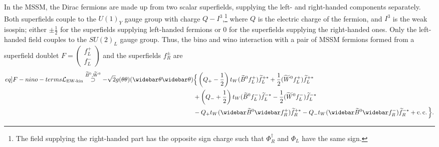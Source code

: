\documentclass[english, notitlepage]{article}
\begin{document}
            In the MSSM, the Dirac fermions are made up from two scalar superfields,
            supplying the left- and right-handed components separately. Both superfields
            couple to the ${U(1)}_Y$ gauge group with charge $Q-I^3$,\footnote{The field
                supplying the right-handed part has the opposite sign charge such that
                $\Phi^\dag_R$ and $\Phi_L$ have the same sign.} where $Q$ is the electric
            charge of the fermion, and $I^3$ is the weak isospin; either $\pm \frac{1}{2}$
            for the superfields supplying left-handed fermions or 0 for the superfields
            supplying the right-handed ones. Only the left-handed field couples to the
            ${SU(2)}_L$ gauge group. Thus, the bino and wino interaction with a pair of
            MSSM fermions formed from a superfield doublet $F = \begin{pmatrix} f_L^+ \\ f_L^- \end{pmatrix}$ and the superfields $f_R^\pm$ are
            \begin{align}
                \label[eq]{F-nino-terms}
                \nonumber
                \L_{\text{EW-kin}} \stackrel{\bino, \wino}{\supset} -\sqrt{2} g (\theta\theta)(\wbar\theta\wbar\theta) & \Big\{ \pclosed{Q_+-\frac{1}{2}}t_W (\bino f_L^+) \wtilde{f}_L^{+*} + \frac{1}{2} (\wino f_L^+) \wtilde{f}_L^{+*}                     \\ \nonumber
                                                                                                                       & + \pclosed{Q_-+\frac{1}{2}}t_W (\bino f_L^-)\wtilde{f}_L^{-*} - \frac{1}{2} (\wino f_L^-)\wtilde{f}_L^{-*}                            \\
                                                                                                                       & - Q_+t_W (\wbar{\wtilde{B}}^0\wbar{f}_R^+)\wtilde{f}_R^{+*} - Q_-t_W (\wbar{\wtilde{B}}^0\wbar{f}_R^-)\wtilde{f}_R^{-*} + \cc \Big\}.
            \end{align}
\end{document}
